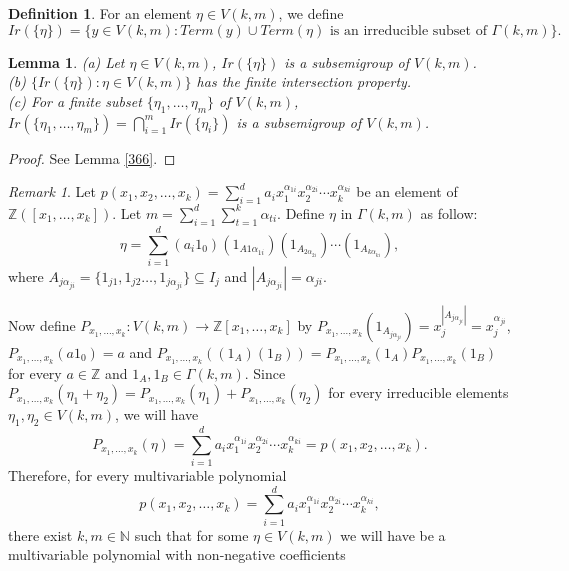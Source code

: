 \documentclass{amsart}
\newtheorem{lemma}[theorem]{Lemma}
\theoremstyle{definition}
\newtheorem{definition}[theorem]{Definition}
\theoremstyle{remark}
\newtheorem{remark}[theorem]{Remark}
\numberwithin{equation}{section}
\begin{document}
\begin{definition}
	For an element $\eta\in V(k,m)$, we define 
	\[
	Ir(\{\eta\})=\{y\in V(k,m):Term(y)\cup Term(\eta)\mbox{ is an irreducible subset of }\Gamma(k,m)\}.
	\] 
\end{definition}
\begin{lemma}
	(a) Let $\eta\in V(k,m)$, $Ir(\{\eta\})$ is a subsemigroup of $V(k,m)$.\\ 
	(b) $\{Ir(\{\eta\}):\eta\in V(k,m)\}$ has the finite intersection property.\\
	(c) For a finite subset $\{\eta_1,\ldots,\eta_m\}$ of $V(k,m)$, $Ir(\{\eta_1,\ldots,\eta_m\})=\bigcap_{i=1}^mIr(\{\eta_i\})$ is a subsemigroup of $V(k,m)$.
\end{lemma}
\begin{proof}
	See Lemma \ref{366}.
\end{proof}
\begin{remark}
Let \(p(x_1, x_2, \ldots, x_k)=\sum_{i=1}^d a_{i} x_1^{\alpha_{1i}}x_2^{\alpha_{2i}}\cdots x_k^{\alpha_{ki}}\) be an element of $\mathbb{Z}([x_1,\ldots,x_k])$. Let $m=\sum_{i=1}^d\sum_{t=1}^k\alpha_{ti}$. Define $\eta$ in $\Gamma(k,m)$ as follow: 
\[
\eta=\sum_{i=1}^d(a_i1_0)(1_{A1\alpha_{1i}})(1_{A_{2\alpha_{2i}}})\cdots(1_{A_{k\alpha_{ki}}}), 
\]
where $A_{j\alpha_{ji}}=\{1_{j1},1_{j2}\ldots,1_{j\alpha_{ji}}\}\subseteq I_j$ and $|A_{j\alpha_{ji}}|=\alpha_{ji}$. 

Now define 
$P_{x_1,\ldots,x_k}:V(k,m)\to\mathbb{Z}[x_1,\ldots,x_k]$ by $P_{x_1,\ldots,x_k}(1_{A_{j\alpha_{ji}}})=x_j^{|A_{j\alpha_{ji}}|}=x_j^{\alpha_{ji}}$, $P_{x_1,\ldots,x_k}(a1_0)=a$ and $P_{x_1,\ldots,x_k}((1_A)(1_B))=P_{x_1,\ldots,x_k}(1_A)P_{x_1,\ldots,x_k}(1_B)$ for every $a\in\mathbb{Z}$ and $1_A,1_B\in \Gamma(k,m)$. Since 
$P_{x_1,\ldots,x_k}(\eta_1+\eta_2)=P_{x_1,\ldots,x_k}(\eta_1)+P_{x_1,\ldots,x_k}(\eta_2)$ for every irreducible elements $\eta_1,\eta_2\in V(k,m)$, we will have 
\[
P_{x_1,\ldots,x_k}(\eta)=\sum_{i=1}^d a_{i} x_1^{\alpha_{1i}}x_2^{\alpha_{2i}}\cdots x_k^{\alpha_{ki}}=p(x_1, x_2, \ldots, x_k).
\]  
Therefore, for every multivariable polynomial 
\[
p(x_1, x_2, \ldots, x_k)=\sum_{i=1}^d a_{i} x_1^{\alpha_{1i}}x_2^{\alpha_{2i}}\cdots x_k^{\alpha_{ki}},
\]
 there exist $k,m\in\mathbb{N}$ such that for some $\eta\in V(k,m)$ we will have be a multivariable polynomial with non-negative coefficients
\end{remark}
\end{document}
